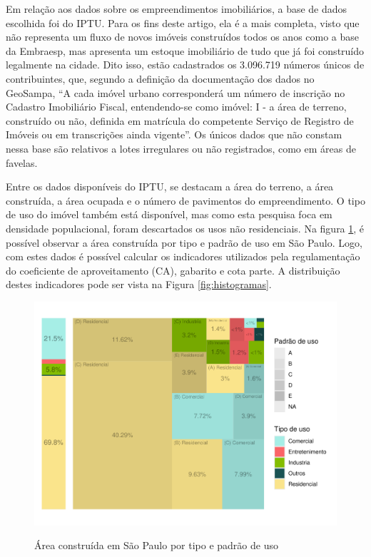 Em relação aos dados sobre os empreendimentos imobiliários, a base de dados escolhida foi do IPTU. Para os fins deste artigo, ela é a mais completa, visto que não representa um fluxo de novos imóveis construídos todos os anos como a base da Embraesp, mas apresenta um estoque imobiliário de tudo que já foi construído legalmente na cidade. Dito isso, estão cadastrados os 3.096.719 números únicos de contribuintes, que, segundo a definição da documentação dos dados no GeoSampa, ``A cada imóvel urbano corresponderá um número de inscrição no Cadastro Imobiliário Fiscal, entendendo-se como imóvel: I - a área de terreno, construído ou não, definida em matrícula do competente Serviço de Registro de Imóveis ou em transcrições ainda vigente''. Os únicos dados que não constam nessa base são relativos a lotes irregulares ou não registrados, como em áreas de favelas. 

Entre os dados disponíveis do IPTU, se destacam a área do terreno, a área construída, a área ocupada e o número de pavimentos do empreendimento. O tipo de uso do imóvel também está disponível, mas como esta pesquisa foca em densidade populacional, foram descartados os usos não residenciais. Na figura \ref{fig:area_construida}, é possível observar a área construída por tipo e padrão de uso em São Paulo. Logo, com estes dados é possível calcular os indicadores utilizados pela regulamentação do coeficiente de aproveitamento (CA), gabarito e cota parte. A distribuição destes indicadores pode ser vista na Figura \ref{fig:histogramas}.

\begin{figure}[h]
    \centering
    \caption{Área construída em São Paulo por tipo e padrão de uso}
    \includegraphics[width = .8\linewidth]{imagens/tree_area_construida.pdf}
    \label{fig:area_construida}
\end{figure}

